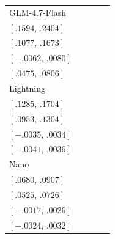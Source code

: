 \begin{tabular*}{\linewidth}{@{\extracolsep{\fill}}lcccc@{}}
GLM-4.7-Flash & \begin{tabular}[t]{@{}c@{}}\(.1989\)\\[-1pt]\([.1594,\,.2404]\)\end{tabular} & \begin{tabular}[t]{@{}c@{}}\(.1371\)\\[-1pt]\([.1077,\,.1673]\)\end{tabular} & \begin{tabular}[t]{@{}c@{}}\(.0009\)\\[-1pt]\([-.0062,\,.0080]\)\end{tabular} & \begin{tabular}[t]{@{}c@{}}\(.0642\)\\[-1pt]\([.0475,\,.0806]\)\end{tabular}\\[0.5pt]
Lightning & \begin{tabular}[t]{@{}c@{}}\(.1492\)\\[-1pt]\([.1285,\,.1704]\)\end{tabular} & \begin{tabular}[t]{@{}c@{}}\(.1125\)\\[-1pt]\([.0953,\,.1304]\)\end{tabular} & \begin{tabular}[t]{@{}c@{}}\(-.0001\)\\[-1pt]\([-.0035,\,.0034]\)\end{tabular} & \begin{tabular}[t]{@{}c@{}}\(-.0003\)\\[-1pt]\([-.0041,\,.0036]\)\end{tabular}\\[0.5pt]
Nano & \begin{tabular}[t]{@{}c@{}}\(.0793\)\\[-1pt]\([.0680,\,.0907]\)\end{tabular} & \begin{tabular}[t]{@{}c@{}}\(.0624\)\\[-1pt]\([.0525,\,.0726]\)\end{tabular} & \begin{tabular}[t]{@{}c@{}}\(.0005\)\\[-1pt]\([-.0017,\,.0026]\)\end{tabular} & \begin{tabular}[t]{@{}c@{}}\(.0004\)\\[-1pt]\([-.0024,\,.0032]\)\end{tabular}\\[0.5pt]

\end{tabular*}
